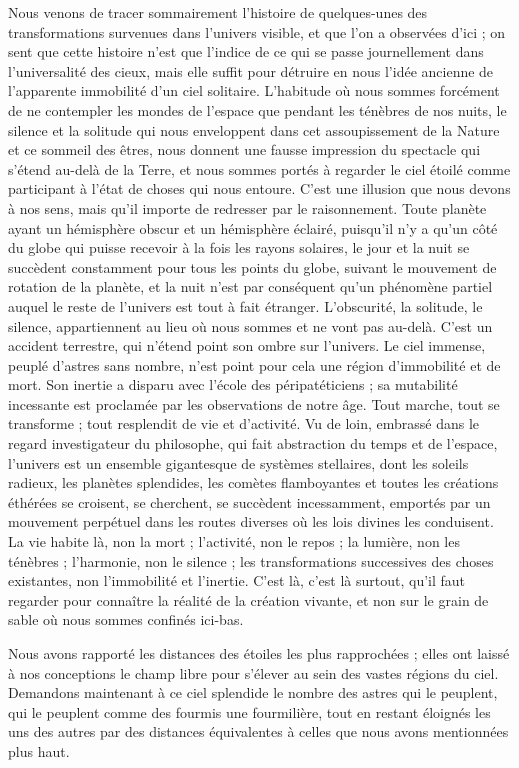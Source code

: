 \documentclass[a4paper, 11pt, oneside]{article}
\begin{document}
Nous venons de tracer sommairement l'histoire de quelques-unes des transformations survenues dans l'univers visible, et que l'on a observées d'ici ; on sent que cette histoire n'est que l'indice de ce qui se passe journellement dans l'universalité des cieux, mais elle suffit pour détruire en nous l'idée ancienne de l'apparente immobilité d'un ciel solitaire. L'habitude où nous sommes forcément de ne contempler les mondes de l'espace que pendant les ténèbres de nos nuits, le silence et la solitude qui nous enveloppent dans cet assoupissement de la Nature et ce sommeil des êtres, nous donnent une fausse impression du spectacle qui s'étend au-delà de la Terre, et nous sommes portés à regarder le ciel étoilé comme participant à l'état de choses qui nous entoure. C'est une illusion que nous devons à nos sens, mais qu'il importe de redresser par le raisonnement. Toute planète ayant un hémisphère obscur et un hémisphère éclairé, puisqu'il n'y a qu'un côté du globe qui puisse recevoir à la fois les rayons solaires, le jour et la nuit se succèdent constamment pour tous les points du globe, suivant le mouvement de rotation de la planète, et la nuit n'est par conséquent qu'un phénomène partiel auquel le reste de l'univers est tout à fait étranger. L'obscurité, la solitude, le silence, appartiennent au lieu où nous sommes et ne vont pas au-delà. C'est un accident terrestre, qui n'étend point son ombre sur l'univers. Le ciel immense, peuplé d'astres sans nombre, n'est point pour cela une région d'immobilité et de mort. Son inertie a disparu avec l'école des péripatéticiens ; sa mutabilité incessante est proclamée par les observations de notre âge. Tout marche, tout se transforme ; tout resplendit de vie et d'activité. Vu de loin, embrassé dans le regard investigateur du philosophe, qui fait abstraction du temps et de l'espace, l'univers est un ensemble gigantesque de systèmes stellaires, dont les soleils radieux, les planètes splendides, les comètes flamboyantes et toutes les créations éthérées se croisent, se cherchent, se succèdent incessamment, emportés par un mouvement perpétuel dans les routes diverses où les lois divines les conduisent. La vie habite là, non la mort ; l'activité, non le repos ; la lumière, non les ténèbres ; l'harmonie, non le silence ; les transformations successives des choses existantes, non l'immobilité et l'inertie. C'est là, c'est là surtout, qu'il faut regarder pour connaître la réalité de la création vivante, et non sur le grain de sable où nous sommes confinés ici-bas.

Nous avons rapporté les distances des étoiles les plus rapprochées ; elles ont laissé à nos conceptions le champ libre pour s'élever au sein des vastes régions du ciel. Demandons maintenant à ce ciel splendide le nombre des astres qui le peuplent, qui le peuplent comme des fourmis une fourmilière, tout en restant éloignés les uns des autres par des distances équivalentes à celles que nous avons mentionnées plus haut.
\end{document}
